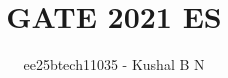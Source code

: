 \documentclass[journal]{IEEEtran}
\begin{document}

\vspace{3cm}


\title{GATE 2021 ES}
\author{ee25btech11035 - Kushal B N}
\maketitle
{\let\newpage\relax\maketitle}

\renewcommand{\thefigure}{\theenumi}
\renewcommand{\thetable}{\theenumi}
\setlength{\intextsep}{10pt} %
\end{document}
